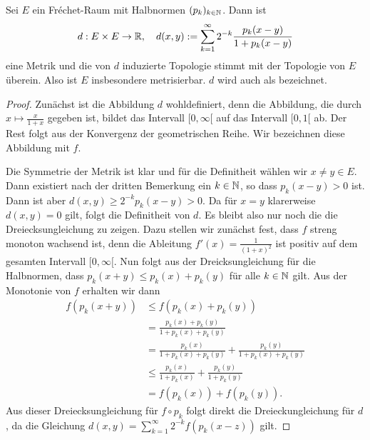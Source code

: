 \begin{prop}
  \label{prop:frechet-metrik}
  Sei $E$ ein Fr\'echet-Raum mit Halbnormen $(p_k)_{k \in \mathbb{N}}$. Dann
  ist
  \[
  d: E \times E \rightarrow \mathbb{R}, \quad d(x,y) := \sum_{k=1}^\infty 2^{-k}
  \frac{p_k(x-y)}{1 + p_k(x-y)}
  \]
  eine Metrik und die von $d$ induzierte Topologie stimmt mit der
  Topologie von $E$ überein. Also ist $E$ insbesondere
  metrisierbar. $d$ wird auch als  bezeichnet.
\end{prop}

\begin{proof}
  Zunächst ist die Abbildung $d$ wohldefiniert, denn die Abbildung,
  die durch $x \mapsto \frac{x}{1+x}$ gegeben ist, bildet das
  Intervall $[0, \infty[$ auf das Intervall $[0,1[$ ab. Der Rest folgt
  aus der Konvergenz der geometrischen Reihe. Wir bezeichnen
  diese  Abbildung mit $f$.

  Die Symmetrie der Metrik ist klar und für die Definitheit wählen wir
  $x\neq y \in E$. Dann existiert nach der dritten Bemerkung ein $k \in
  \mathbb{N}$, so dass $p_k(x-y) >0$ ist. Dann ist aber $d(x,y) \geq
  2^{-k}p_k(x-y) > 0$. Da für $x =y$ klarerweise $d(x,y) =0$ gilt,
  folgt die Definitheit von $d$. Es bleibt also nur noch die die
  Dreiecksungleichung zu zeigen. Dazu stellen wir zunächst fest, dass
  $f$ streng monoton wachsend ist, denn die Ableitung $f'(x) =
  \frac{1}{(1+x)^2}$ ist positiv auf dem gesamten Intervall $[0,
  \infty[$. Nun folgt aus der Dreicksungleichung für die Halbnormen,
  dass $p_k(x+y) \leq p_k(x) + p_k(y)$ für alle $k \in \mathbb{N}$ gilt. Aus
  der Monotonie von $f$ erhalten wir dann
  \begin{align*}
    f(p_k(x+y)) & \leq f(p_k(x) + p_k(y)) \\
    & = \frac{ p_k(x) + p_k(y)}{1 + p_k(x) + p_k(y)}\\
    & = \frac{p_k(x)}{1+ p_k(x)+p_k(y)} + \frac{p_k(y)}{1+p_k(x) +
      p_k(y)} \\
    & \leq \frac{p_k(x)}{1+p_k(x)} + \frac{p_k(y)}{1+ p_k(y)} \\
    & = f(p_k(x)) + f(p_k(y)).
  \end{align*}
  Aus dieser Dreiecksungleichung für $f \circ p_k$ folgt direkt die
  Dreieckungleichung für $d$, da die Gleichung $d(x,y) = \sum_{k=1}^\infty
  2^{-k}f(p_k(x-z))$ gilt.
  

\end{proof}
